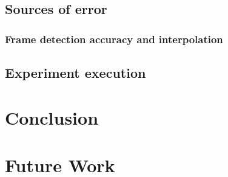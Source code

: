 \documentclass[nofilelist]{cslthse-msc}
\begin{document}
\section{Sources of error}
\subsection{Frame detection accuracy and interpolation} 

\section{Experiment execution}

\chapter{Conclusion}

\chapter{Future Work}


{}
\end{document}
